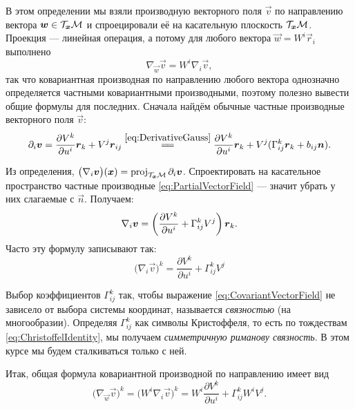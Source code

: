 В этом определении мы взяли производную векторного поля $\vec{v}$ по направлению вектора $\boldsymbol{w} \in \mathcal{T}_{\boldsymbol{x}}\mathcal{M}$ и спроецировали её на касательную плоскость $\mathcal{T}_{\boldsymbol{x}}\mathcal{M}$. Проекция --- линейная операция, а потому для любого вектора $\vec{w} = W^i\vec{r}_i$ выполнено
\[
	\nabla_{\vec{w}}\vec{v} = W^i\nabla_i\vec{v},
\]
так что ковариантная производная по направлению любого вектора однозначно определяется частными ковариантными производными, поэтому полезно вывести общие формулы для последних. Сначала найдём обычные частные производные векторного поля $\vec{v}$:
\begin{equation} \label{eq:PartialVectorField}
	\partial_i\vec{v} = \frac{\partial V^k}{\partial u^i}\vec{r}_k + V^j\vec{r}_{ij} \stackrel{\eqref{eq:DerivativeGauss}}{=\joinrel=} \frac{\partial V^k}{\partial u^i}\vec{r}_k + V^j(\Gamma_{ij}^k\vec{r}_k + b_{ij}\vec{n}).
\end{equation}

Из определения, $\big(\nabla_i\boldsymbol{v}\big)(\boldsymbol{x}) = \operatorname{proj}_{\mathcal{T}_{\boldsymbol{x}}\mathcal{M}}\partial_i\boldsymbol{v}$. Спроектировать на касательное пространство частные производные \eqref{eq:PartialVectorField} --- значит убрать у них слагаемые с $\vec{n}$. Получаем:
\[
	\nabla_i\boldsymbol{v} = \left(\frac{\partial V^k}{\partial u^i} + \Gamma_{ij}^kV^j\right)\boldsymbol{r}_k.
\]
Часто эту формулу записывают так:
\begin{equation} \label{eq:CovariantVectorField}
	\big(\nabla_i\vec{v}\big)^k = \frac{\partial V^k}{\partial u^i} + \Gamma_{ij}^kV^j
\end{equation}

Выбор коэффициентов $\Gamma_{ij}^k$ так, чтобы выражение \eqref{eq:CovariantVectorField} не зависело от выбора системы координат, называется \textit{связностью} (на многообразии). Определяя $\Gamma_{ij}^k$ как символы Кристоффеля, то есть по тождествам \eqref{eq:ChristoffelIdentity}, мы получаем \textit{симметричную риманову связность}. В этом курсе мы будем сталкиваться только с ней.

Итак, общая формула ковариантной производной по направлению имеет вид
\begin{equation} \label{eq:CovariantFormula}
	\big(\nabla_{\vec{w}}\vec{v}\big)^k = \big(W^i\nabla_i\vec{v}\big)^k = W^i\frac{\partial V^k}{\partial u^i} + \Gamma_{ij}^kW^iV^j.
\end{equation}

